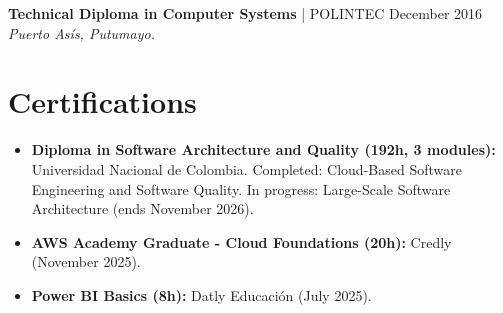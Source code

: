 \documentclass[11pt,a4paper]{article}
\begin{document}
\noindent
\textbf{Technical Diploma in Computer Systems} | POLINTEC \hfill December 2016 \\
\textit{Puerto Asís, Putumayo.}

\section*{Certifications}
\begin{itemize}[leftmargin=*, noitemsep]
    \item \textbf{Diploma in Software Architecture and Quality (192h, 3 modules):} Universidad Nacional de Colombia. Completed: Cloud-Based Software Engineering and Software Quality. In progress: Large-Scale Software Architecture (ends November 2026).
    \item \textbf{AWS Academy Graduate - Cloud Foundations (20h):} Credly (November 2025).
    \item \textbf{Power BI Basics (8h):} Datly Educación (July 2025).
\end{itemize}
\end{document}
